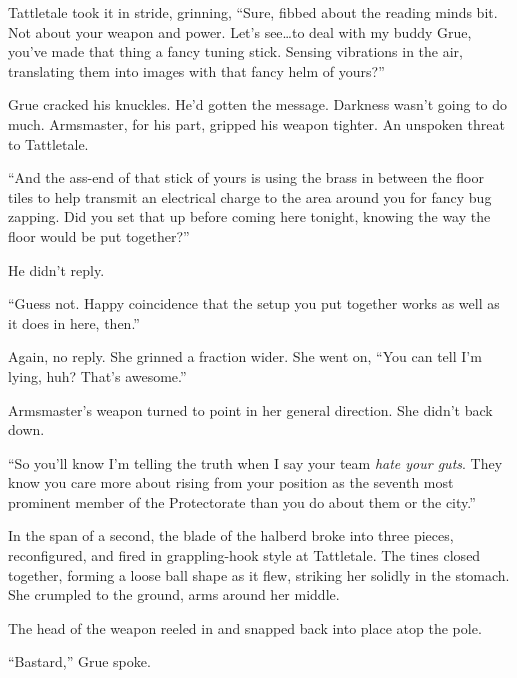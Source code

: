 Tattletale took it in stride, grinning, ``Sure, fibbed about the reading minds bit.  Not about your weapon and power.  Let's see\ldots to deal with my buddy Grue, you've made that thing a fancy tuning stick.  Sensing vibrations in the air, translating them into images with that fancy helm of yours?''



Grue cracked his knuckles.  He'd gotten the message.  Darkness wasn't going to do much.  Armsmaster, for his part, gripped his weapon tighter.  An unspoken threat to Tattletale.



``And the ass-end of that stick of yours is using the brass in between the floor tiles to help transmit an electrical charge to the area around you for fancy bug zapping.  Did you set that up before coming here tonight, knowing the way the floor would be put together?''



He didn't reply.



``Guess not.  Happy coincidence that the setup you put together works as well as it does in here, then.''



Again, no reply.  She grinned a fraction wider.  She went on, ``You can tell I'm lying, huh?  That's awesome.''



Armsmaster's weapon turned to point in her general direction.  She didn't back down.



``So you'll know I'm telling the truth when I say your team \emph{hate your guts}.  They know you care more about rising from your position as the seventh most prominent member of the Protectorate than you do about them or the city.''



In the span of a second, the blade of the halberd broke into three pieces, reconfigured, and fired in grappling-hook style at Tattletale.  The tines closed together, forming a loose ball shape as it flew, striking her solidly in the stomach.  She crumpled to the ground, arms around her middle.



The head of the weapon reeled in and snapped back into place atop the pole.



``Bastard,'' Grue spoke.



